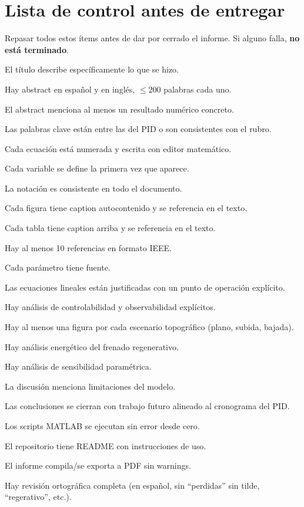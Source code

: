 \documentclass[11pt,a4paper]{article}
\begin{document}
\section{Lista de control antes de entregar}

Repasar todos estos ítems antes de dar por cerrado el informe. Si alguno falla, \textbf{no está terminado}.

\begin{checklist}
    \item El título describe específicamente lo que se hizo.
    \item Hay abstract en español y en inglés, $\leq 200$ palabras cada uno.
    \item El abstract menciona al menos un resultado numérico concreto.
    \item Las palabras clave están entre las del PID o son consistentes con el rubro.
    \item Cada ecuación está numerada y escrita con editor matemático.
    \item Cada variable se define la primera vez que aparece.
    \item La notación es consistente en todo el documento.
    \item Cada figura tiene caption autocontenido y se referencia en el texto.
    \item Cada tabla tiene caption arriba y se referencia en el texto.
    \item Hay al menos 10 referencias en formato IEEE.
    \item Cada parámetro tiene fuente.
    \item Las ecuaciones lineales están justificadas con un punto de operación explícito.
    \item Hay análisis de controlabilidad y observabilidad explícitos.
    \item Hay al menos una figura por cada escenario topográfico (plano, subida, bajada).
    \item Hay análisis energético del frenado regenerativo.
    \item Hay análisis de sensibilidad paramétrica.
    \item La discusión menciona limitaciones del modelo.
    \item Las conclusiones se cierran con trabajo futuro alineado al cronograma del PID.
    \item Los scripts MATLAB se ejecutan sin error desde cero.
    \item El repositorio tiene README con instrucciones de uso.
    \item El informe compila/se exporta a PDF sin warnings.
    \item Hay revisión ortográfica completa (en español, sin ``perdidas'' sin tilde, ``regerativo'', etc.).
\end{checklist}
\end{document}

